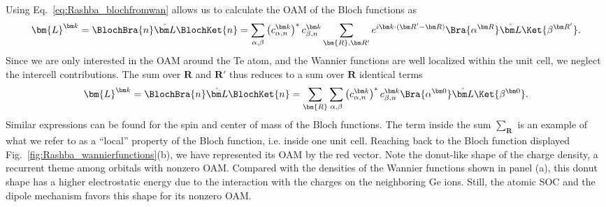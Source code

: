 Using Eq.~\eqref{eq:Rashba_blochfromwan} allows us to calculate the OAM of the Bloch functions as
\begin{equation}
\bm{L}^{\bm k} = \BlochBra{n} \hat{\bm L} \BlochKet{n} = \sum_{\alpha,\beta}\left(c_{\alpha,n}^{\bm k}\right)^* c_{\beta,n}^{\bm k}\sum_{\bm{R}, \bm R'}e^{i \bm k \cdot (\bm R' - \bm R)}\Bra{\alpha^{\bm R}}\hat{\bm L} \Ket{\beta^{\bm R'}}.
\end{equation}
Since we are only interested in the OAM around the Te atom, and the Wannier functions are well localized within the unit cell, we neglect the intercell contributions. The sum over $\bm R$ and $\bm R'$ thus reduces to a sum over $\bm R$ identical terms
\begin{equation}
\bm{L}^{\bm k} = \BlochBra{n} \hat{\bm L} \BlochKet{n} =\sum_{\bm{R}} \sum_{\alpha,\beta}\left(c_{\alpha,n}^{\bm k}\right)^* c_{\beta,n}^{\bm k}\Bra{\alpha^{\bm 0}}\hat{\bm L} \Ket{\beta^{\bm 0}}.
\end{equation}
Similar expressions can be found for the spin and center of mass of the Bloch functions. The term inside the sum $\sum_{\bm R}$ is an example of what we refer to as a ``local'' property of the Bloch function, i.e. inside one unit cell. Reaching back to the Bloch function displayed Fig.~\ref{fig:Rashba_wannierfunctions}(b), we have represented its OAM by the red vector. Note the donut-like shape of the charge density, a recurrent theme among orbitals with nonzero OAM. Compared with the densities of the Wannier functions shown in panel (a), this donut shape has a higher electrostatic energy due to the interaction with the charges on the neighboring Ge ions. Still, the atomic SOC and the dipole mechanism favors this shape for its nonzero OAM. 

